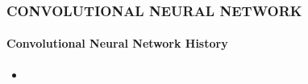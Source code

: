 \documentclass[11pt]{beamer}
\begin{document}
	\begin{frame}
		\frametitle{\textbf{CONVOLUTIONAL NEURAL NETWORK}}
		\framesubtitle{Convolutional Neural Network History}
		\begin{itemize}
			\item 
		\end{itemize}
		
	\end{frame}

	
\end{document}
